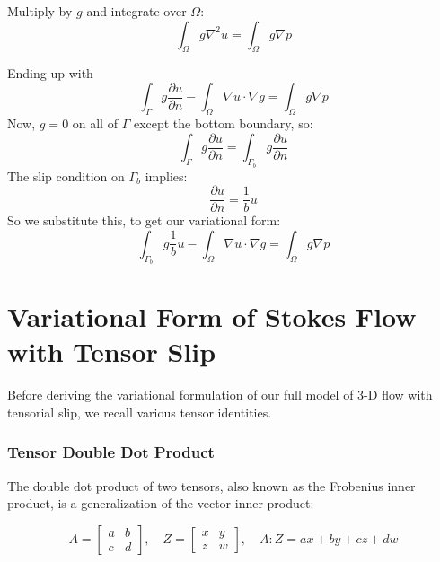 \documentclass[a4paper]{report}
\begin{document}
Multiply  by $g$ and integrate over $\Omega$:
\begin{equation}
\int_{\Omega} g \nabla^2 u = \int_{\Omega} g \nabla p
\end{equation}

Ending up with
\begin{equation}
\int_{\Gamma} g \frac{\partial u}{\partial n}
 - \int_{\Omega} \nabla u \cdot \nabla g  
= \int_{\Omega} g \nabla p
\end{equation}
Now, $g=0$ on all of $\Gamma$ except the bottom boundary, so:
\begin{equation}
\int_{\Gamma} g \frac{\partial u}{\partial n}
= \int_{\Gamma_b} g \frac{\partial u}{\partial n}
\end{equation}
The slip condition on $\Gamma_b$ implies:
\begin{equation}
\frac{\partial u}{\partial n} = \frac{1}{b}u
\end{equation}
So we substitute this, to get our variational form:
\begin{equation}
\int_{\Gamma_b} g \frac{1}{b} u 
 - \int_{\Omega} \nabla u \cdot \nabla g  
= \int_{\Omega} g \nabla p
\end{equation}


\section*{Variational Form of Stokes Flow with Tensor Slip}

Before deriving the variational formulation of our full model of 3-D flow with tensorial slip, we recall various tensor identities.

\subsubsection*{Tensor Double Dot Product}

The double dot product of two tensors, also known as the Frobenius inner product, is a generalization of the vector inner product:

\begin{equation*}
A = 
\begin{bmatrix}
a & b \\
c & d
\end{bmatrix}
, \quad Z = 
\begin{bmatrix}
x & y \\
z & w
\end{bmatrix}
, \quad
A:Z = ax + by + cz + dw
\end{equation*}
\end{document}

